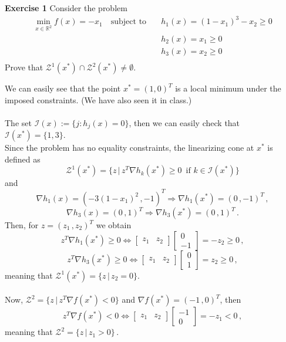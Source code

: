 \documentclass[12pt,letterpaper]{article}
\title{}
\theoremstyle{definition}
\begin{document}
\textbf{Exercise 1} 
Consider the problem 
$$\begin{aligned}
\min_{x\in \mathbb{R}^2} f(x) = -x_1  \quad \text{subject to} \quad 
& h_1(x) = (1-x_1)^3 -x_2 \geq 0 \\
& h_2(x) = x_1 \geq 0 \\
& h_3(x) = x_2 \geq 0 \\
\end{aligned}$$
Prove that $\mathcal{Z}^1(x^*) \cap \mathcal{Z}^2(x^*) \neq \emptyset$.

We can easily see that the point $x^* = (1, 0)^T$ is a local minimum under the imposed constraints. (We have also seen it in class.)
\\\\The set $\mathcal{I}(x):= \{j: h_j(x) = 0\}$, then we can easily check that $\mathcal{I}(x^*) = \{1, 3\}$.
\\Since the problem has no equality constraints, the linearizing cone at $x^*$ is defined as $$\mathcal{Z}^1(x^*) = \{z\,|\, z^T\nabla h_k(x^*)\geq 0 \,\text{ if } k\in \mathcal{I}(x^*)\}$$ and $$\nabla h_1(x) = (-3(1-x_1)^2\,, -1)^T \Longrightarrow \nabla h_1(x^*) = (0\,, -1)^T\,,$$ $$\nabla h_3(x) = (0\,, 1)^T \Longrightarrow \nabla h_3(x^*) = (0\,, 1)^T\,.$$ Then, for $z=(z_1\,, z_2)^T$ we obtain $$z^T\nabla h_1(x^*)\geq 0 \Longleftrightarrow \begin{bmatrix} z_1 & z_2 \end{bmatrix}\begin{bmatrix}0 \\ -1 \end{bmatrix} = -z_2 \geq 0\,,$$ $$z^T\nabla h_3(x^*)\geq 0 \Longleftrightarrow \begin{bmatrix} z_1 & z_2 \end{bmatrix}\begin{bmatrix}0 \\ 1 \end{bmatrix} = z_2 \geq 0\,,$$ meaning that $\mathcal{Z}^1(x^*) = \{z\,|\, z_2 = 0\}$.
\\\\Now, $\mathcal{Z}^2 = \{z \,|\,z^T\nabla f(x^*)<0\}$ and $\nabla f(x^*) = (-1\,, 0)^T$, then $$z^T\nabla f(x^*) < 0 \Longleftrightarrow \begin{bmatrix} z_1 & z_2 \end{bmatrix}\begin{bmatrix}-1 \\ 0 \end{bmatrix} = -z_1 < 0\,,$$ meaning that $\mathcal{Z}^2 = \{z \,|\,z_1>0\}\,.$
\end{document}
